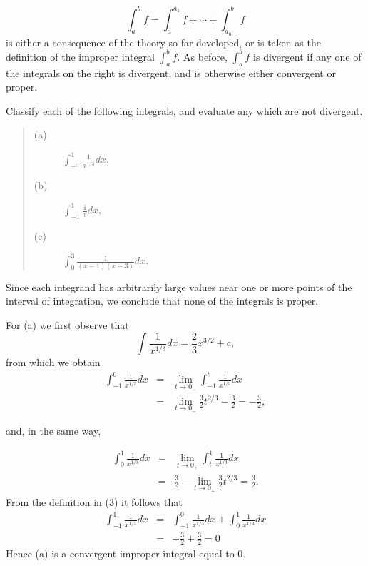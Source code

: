 \begin{equation}
\int_a^b f = \int_a^{a_1} f + \cdots + \int_{a_n}^b f   
\label{eq8.7.3}
\end{equation}
\noindent is either a consequence of the theory so far developed, or is taken as the definition of the improper integral $\int_a^b f$. As before, $\int_a^b f$ is divergent if any one of the integrals on the right is divergent, and is otherwise either convergent or proper.

\begin{example}
Classify each of the following integrals, and evaluate any which are not divergent.
 
\begin{quote}
\begin{description}
\item[(a)] $\int_{-1}^1 \frac{1}{x^{1/3}} dx,$ 
\item[(b)] $\int_{-1}^1 \frac{1}{x} dx,$
\item[(c)] $\int_0^3 \frac{1}{(x-1)(x-3)} dx.$
\end{description}
\end{quote} 
\noindent Since each integrand has arbitrarily large values near one or more points of the interval of integration, we conclude that none of the integrals is proper. 

For (a) we first observe that
$$
\int \frac{1}{x^{1/3}} dx = \frac{2}{3} x^{3/2} + c,
$$
\noindent from which we obtain 
\begin{eqnarray*}
\int_{-1}^0 \frac{1}{x^{1/3}} dx 
&=& \lim_{t \rightarrow 0_{-}} \int_{-1}^t \frac{1}{x^{1/3}} dx \\
&=& \lim_{t \rightarrow 0_{-}} \frac{3}{2} t^{2/3} - \frac{3}{2} = -\frac{3}{2} ,
\end{eqnarray*}

\noindent and, in the same way, 

\begin{eqnarray*}
\int_0^1 \frac{1}{x^{1/3}} dx 
&=& \lim_{t \rightarrow 0_{+}} \int_t^1 \frac{1}{x^{1/3}} dx \\
&=& \frac{3}{2} - \lim_{t \rightarrow 0_{+}} \frac{3}{2} t^{2/3} = \frac{3}{2} .
\end{eqnarray*}
\noindent From the definition in (3) it follows that 
\begin{eqnarray*}
\int_{-1}^1\frac{1}{x^{1/3}} dx 
&=& \int_{-1}^0 \frac{1}{x^{1/3}} dx + \int_0^1 \frac{1}{x^{1/3}} dx \\
&=& - \frac{3}{2} + \frac{3}{2} = 0
\end{eqnarray*}
\noindent Hence (a) is a convergent improper integral equal to 0.


\end{example}
